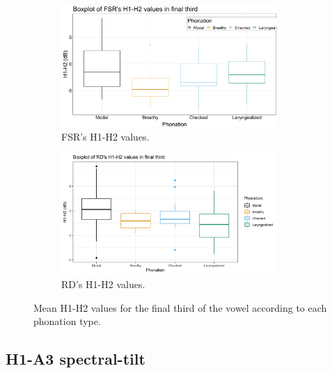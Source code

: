 \documentclass[12pt, letterpaper]{article}
\begin{document}
\begin{figure}[!ht]
	\centering
	\begin{subfigure}{.5\textwidth}
		\centering
		\includegraphics[width=0.9\textwidth]{../mean_FSR_h1h2_3rd.png}
		\caption{FSR's H1-H2 values.}
		\label{fig:FSRh1h2third} 
	\end{subfigure}%
	\begin{subfigure}{.5\textwidth}
		\centering
		\includegraphics[width=0.9\textwidth]{../mean_RD_h1h2_3rd.png}
		\caption{RD's H1-H2 values.}
		\label{fig:RDh1h2third} 
	\end{subfigure}
	\caption{Mean H1-H2 values for the final third of the vowel according to each phonation type. }
	\label{fig:h1h2third}
\end{figure}
\subsection{H1-A3 spectral-tilt} \label{sec:H1A3}
\end{document}
